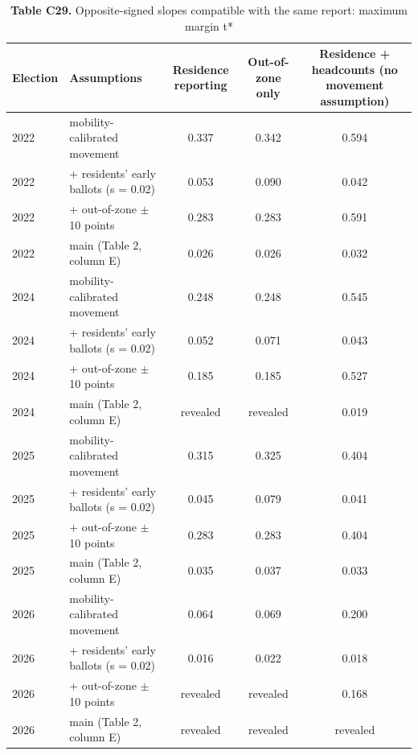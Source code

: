 \begin{table}[!htbp]
\centering
\scriptsize
\setlength{\tabcolsep}{3.5pt}
\caption*{\textbf{Table C29.} Opposite-signed slopes compatible with the same report: maximum margin t*}
\begin{tabularx}{\linewidth}{llccc}
\toprule
Election & Assumptions & Residence reporting & Out-of-zone only & Residence + headcounts (no movement assumption) \\
\midrule
2022 & mobility-calibrated movement & 0.337 & 0.342 & 0.594 \\
2022 & + residents' early ballots (s = 0.02) & 0.053 & 0.090 & 0.042 \\
2022 & + out-of-zone $\pm $10 points & 0.283 & 0.283 & 0.591 \\
2022 & main (Table 2, column E) & 0.026 & 0.026 & 0.032 \\
2024 & mobility-calibrated movement & 0.248 & 0.248 & 0.545 \\
2024 & + residents' early ballots (s = 0.02) & 0.052 & 0.071 & 0.043 \\
2024 & + out-of-zone $\pm $10 points & 0.185 & 0.185 & 0.527 \\
2024 & main (Table 2, column E) & revealed & revealed & 0.019 \\
2025 & mobility-calibrated movement & 0.315 & 0.325 & 0.404 \\
2025 & + residents' early ballots (s = 0.02) & 0.045 & 0.079 & 0.041 \\
2025 & + out-of-zone $\pm $10 points & 0.283 & 0.283 & 0.404 \\
2025 & main (Table 2, column E) & 0.035 & 0.037 & 0.033 \\
2026 & mobility-calibrated movement & 0.064 & 0.069 & 0.200 \\
2026 & + residents' early ballots (s = 0.02) & 0.016 & 0.022 & 0.018 \\
2026 & + out-of-zone $\pm $10 points & revealed & revealed & 0.168 \\
2026 & main (Table 2, column E) & revealed & revealed & revealed \\
\bottomrule
\end{tabularx}
\par{}
\end{table}
